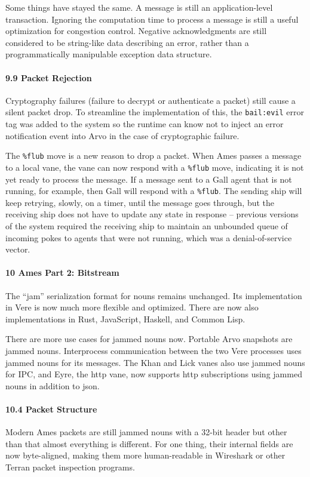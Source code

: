\documentclass[twoside]{article}
\begin{document}
Some things have stayed the same.  A message is still an application-level transaction.  Ignoring the computation time to process a message is still a useful optimization for congestion control.  Negative acknowledgments are still considered to be string-like data describing an error, rather than a programmatically manipulable exception data structure.

\paragraph{9.9 Packet Rejection}  Cryptography failures (failure to decrypt or authenticate a packet) still cause a silent packet drop.  To streamline the implementation of this, the \lstinline[style=inlinecode]{bail:evil} error tag was added to the system so the runtime can know not to inject an error notification event into Arvo in the case of cryptographic failure.

The \lstinline[style=inlinecode]{%flub} move is a new reason to drop a packet.  When Ames passes a message to a local vane, the vane can now respond with a \lstinline[style=inlinecode]{%flub} move, indicating it is not yet ready to process the message.  If a message sent to a Gall agent that is not running, for example, then Gall will respond with a \lstinline[style=inlinecode]{%flub}.  The sending ship will keep retrying, slowly, on a timer, until the message goes through, but the receiving ship does not have to update any state in response – previous versions of the system required the receiving ship to maintain an unbounded queue of incoming pokes to agents that were not running, which was a denial-of-service vector.

\paragraph{10 Ames Part 2:  Bitstream}  The ``jam'' serialization format for nouns remains unchanged.  Its implementation in Vere is now much more flexible and optimized.  There are now also implementations in Rust, JavaScript, Haskell, and Common Lisp.

There are more use cases for jammed nouns now.  Portable Arvo snapshots are jammed nouns.  Interprocess communication between the two Vere processes uses jammed nouns for its messages.  The Khan and Lick vanes also use jammed nouns for IPC, and Eyre, the {\sc http} vane, now supports {\sc http} subscriptions using jammed nouns in addition to {\sc json}.

\paragraph{10.4 Packet Structure}  Modern Ames packets are still jammed nouns with a 32-bit header but other than that almost everything is different.  For one thing, their internal fields are now byte-aligned, making them more human-readable in Wireshark or other Terran packet inspection programs.
\end{document}
